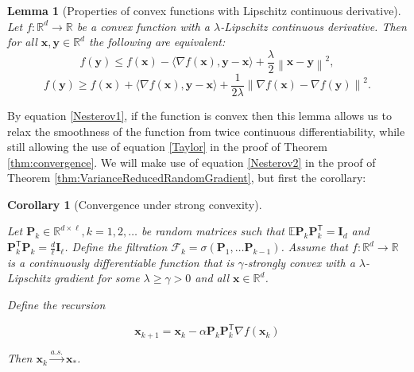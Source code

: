 \documentclass[11pt] {article}
\newcommand{\norm}[1]{\left\lVert#1\right\rVert}
\newcommand{\x}{\pmb{x}}
\newcommand{\y}{\pmb{y}}
\newcommand{\I}{\pmb{I}}
\newcommand{\Expectation}{\mathbb{E}}
\newcommand{\convas}{\overset{a.s.}{\longrightarrow}}
\newcommand{\T}{\mathsf{T}}
\newcommand{\reals}{\mathbb{R}}
\newtheorem{lemma}{Lemma}
\newtheorem{corollary}{Corollary}
\begin{document}
\begin{lemma}[Properties of convex functions with Lipschitz continuous derivative]\label{NesterovWeakening}
	Let $f: \reals^d \to \reals$ be a convex function with a $\lambda$-Lipschitz continuous derivative. Then for all $\x, \y \in \reals^d$ the following are equivalent:
	\begin{equation}\label{Nesterov1}
	f(\y)\leq f(\x) - \langle \nabla f(\x), \y-\x \rangle + \frac{\lambda}{2} \norm{\x-\y}^2,
	\end{equation}
	\begin{equation}\label{Nesterov2}
	f(\y) \geq f(\x) + \langle \nabla f(\x), \y-\x\rangle + \frac{1}{2 \lambda} \norm {\nabla f(\x) - \nabla f(\y)}^2.
	\end{equation}
	
\end{lemma}

By equation \eqref{Nesterov1}, if the function is convex then this lemma allows us to relax the smoothness of the function from twice continuous differentiability, while still allowing the use of equation \eqref{Taylor} in the proof of Theorem \ref{thm:convergence}. We will make use of equation \eqref{Nesterov2} in the proof of Theorem \ref{thm:VarianceReducedRandomGradient}, but first the corollary:


\begin{corollary}[Convergence under strong convexity]\label{corr:convergence}
	
	Let $\mathbf{P}_k \in \reals^{d \times \ell}, k=1,2, \ldots$ be random matrices such that $\Expectation \mathbf{P}_k\mathbf{P}_k^{\T} = \I_d$ and $\mathbf{P}^{\T}_k\mathbf{P}_k=\frac{d}{\ell}\I_{\ell}$. Define the filtration $\mathcal{F}_k = \sigma(\mathbf{P}_1, \ldots \mathbf{P}_{k-1})$. Assume that $f: \reals^d \to \reals$ is a continuously differentiable function that is $\gamma$-strongly convex with a $\lambda$-Lipschitz gradient for some $\lambda \geq \gamma > 0$ and all $\x \in \reals^d$.

	
	Define the recursion
	
	\begin{equation*}
	\x_{k+1} = \x_k - \alpha \mathbf{P}_k\mathbf{P}_k^{\T}\nabla f(\x_k)
	\end{equation*}
	
	Then $\x_k \convas \x_*$.
	
\end{corollary}
\end{document}
